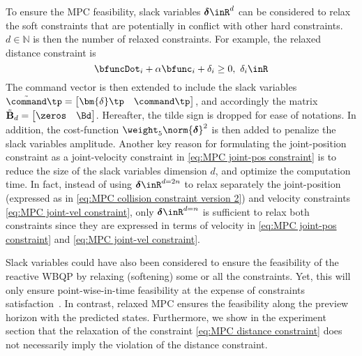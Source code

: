 To ensure the MPC feasibility, slack variables $\boldsymbol{\delta}\inR^{d}$  can be considered to relax the soft constraints that are potentially in conflict with other hard constraints. $d\in\mathbb{N}$ is then the number of relaxed constraints. For example, the relaxed distance constraint is 
\begin{equation}\label{eq:relaxed distance constraint MPC}
	\bfuncDot_{i} + \alpha\bfunc_i + \delta_i \geq0, \ \delta_i\inR 
\end{equation} 
The command vector is then extended to include the slack variables $\tilde{\command}\tp = \begin{bmatrix} \bm{\delta}\tp & \command\tp \end{bmatrix}$, and accordingly the matrix $\tilde{\mathbf{B}}_d = \begin{bmatrix} \zeros & \Bd \end{bmatrix}$. Hereafter, the tilde sign is dropped for ease of notations. In addition, the cost-function  $\weight_{5}\norm{\boldsymbol{\delta}}^2$ is then added to penalize the slack variables amplitude.  Another key reason for formulating the joint-position constraint as a joint-velocity constraint in \cref{eq:MPC joint-pos constraint} is to reduce the size of the slack variables dimension $d$, and optimize the computation time. In fact, instead of using $\boldsymbol{\delta}\inR^{d=2n}$ to relax separately the joint-position (expressed as in \cref{eq:MPC collision constraint version 2}) and velocity constraints \cref{eq:MPC joint-vel constraint}, only $\boldsymbol{\delta}\inR^{d=n}$ is sufficient to relax both constraints since they are expressed in terms of velocity in \cref{eq:MPC joint-pos constraint} and \cref{eq:MPC joint-vel constraint}. 

Slack variables could have also been considered to ensure the feasibility of the reactive WBQP by relaxing (softening) some or all the constraints. Yet, this will only ensure point-wise-in-time feasibility at the expense of constraints satisfaction~\cite{zeng2021acc1}. In contrast, relaxed MPC ensures the feasibility along the preview horizon with the predicted states. %
Furthermore, we show in the experiment section that the relaxation of the constraint \cref{eq:MPC distance constraint} does not necessarily imply the violation of the distance constraint.  

